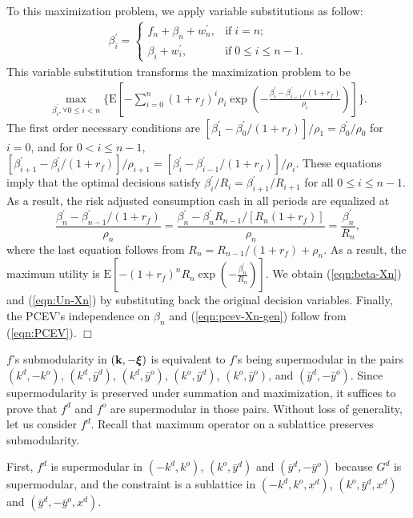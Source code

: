 \documentclass[mnsc,nonblindrev,copyedit]{informs2_wz} %
\newcommand{\E}{\mathrm{E}}
\newcommand{\qed}{ \hfill $\Box$ }
\newcommand{\xiv}{\mbox{\boldmath$\xi$}}
\begin{document}
To this maximization problem, we apply variable substitutions as follow:
\begin{eqnarray*}
\beta_i^{\prime} = \left\{ \begin{array}{ll}
f_n + \beta_n + w_n^\prime, & \mbox{if}\; i = n; \\
\beta_i + w_i^\prime, & \mbox{if} \;  0\leq i \leq n-1.
\end{array}
\right.
\end{eqnarray*}
This variable substitution transforms the maximization problem to be
\begin{eqnarray*}
\max_{\beta_i^{\prime}, \forall 0 \leq i < n}\{\E[ - \sum_{i=0}^{n}(1+r_f)^i\rho_i \exp (-\frac{\beta^\prime_{i} -\beta^\prime_{i-1}/(1+r_f)}{\rho_i}) ]\}.
\end{eqnarray*}
The first order necessary conditions are $[
\beta^\prime_1 - \beta^\prime_0/(1+r_f)]/\rho_1 = \beta^\prime_0/\rho_0$ for $i=0$, and for $0 < i \leq n-1$, $[\beta^\prime_{i+1} -\beta^\prime_{i}/(1+r_f)]/\rho_{i+1}  = [\beta^\prime_{i} -\beta^\prime_{i-1}/(1+r_f)]/\rho_i$. These equations imply that the optimal decisions satisfy $\beta^\prime_i/R_i = \beta_{i+1}^\prime/R_{i+1}$ for all $ 0\leq i\leq n-1$. As a result, the risk adjusted consumption cash in all periods are equalized at
\[ \frac{\beta_n^\prime-\beta_{n-1}^\prime/(1+r_f)}{\rho_n} = \frac{\beta_n^\prime-\beta_{n}^\prime R_{n-1}/[R_n(1+r_f)]}{\rho_n}  = \frac{\beta_n^\prime}{R_n},\]
 where the last equation follows from $R_{n} = R_{n-1}/(1+r_f) + \rho_n$. As a result, the maximum utility is $\E[-(1+r_f)^nR_n \exp (- \frac{\beta^\prime_n}{R_n} )]$. We obtain (\ref{eqn:beta-Xn}) and (\ref{eqn:Un-Xn}) by substituting back the original decision variables. Finally, the PCEV's independence on $\beta_n$ and  (\ref{eqn:pcev-Xn-gen}) follow from (\ref{eqn:PCEV}).
\qed

\medskip

$f$'s submodularity in $(\bold k, -\xiv)$ is equivalent to $f$'s being supermodular in the pairs $(k^d, -k^o)$, $(k^d, \bar{y}^d)$, $(k^d, \bar{y}^o)$, $(k^o, \bar{y}^d)$, $(k^o,\bar{y}^o)$, and $(\bar{y}^d, -\bar{y}^o)$.  Since supermodularity is preserved under summation and maximization, it suffices to prove that $f^d$ and $f^o$ are supermodular in those pairs.  Without loss of generality, let us consider $f^d$.  Recall that maximum operator on a sublattice preserves submodularity.

First, $f^d$ is supermodular in $(-k^d,k^o)$, $(k^o,\bar{y}^d)$ and $(\bar{y}^d,-\bar{y}^o)$ because $G^d$ is supermodular, and the constraint is a sublattice in $(-k^d,k^o,x^d)$, $(k^o,\bar{y}^d,x^d)$ and $(\bar{y}^d,-\bar{y}^o,x^d)$.
\end{document}
